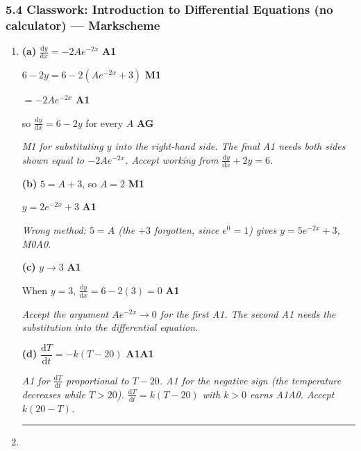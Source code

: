 \documentclass[12pt, twoside]{article}
\begin{document}
\subsubsection*{5.4 Classwork: Introduction to Differential Equations (no calculator) --- Markscheme}

\begin{enumerate}[itemsep=0.3cm]

\item[1.] [Maximum mark: 9]

\textbf{(a)} $\frac{\mathrm{d}y}{\mathrm{d}x} = -2Ae^{-2x}$ \hfill \textbf{A1}

$6 - 2y = 6 - 2\left(Ae^{-2x} + 3\right)$ \hfill \textbf{M1}

$= -2Ae^{-2x}$ \hfill \textbf{A1}

so $\frac{\mathrm{d}y}{\mathrm{d}x} = 6 - 2y$ for every $A$ \hfill \textbf{AG}

\emph{M1 for substituting $y$ into the right-hand side. The final A1 needs
both sides shown equal to $-2Ae^{-2x}$. Accept working from
$\frac{\mathrm{d}y}{\mathrm{d}x} + 2y = 6$.}

\textbf{(b)} $5 = A + 3$, so $A = 2$ \hfill \textbf{M1}

$y = 2e^{-2x} + 3$ \hfill \textbf{A1}

\emph{Wrong method: $5 = A$ (the $+3$ forgotten, since $e^{0} = 1$) gives
$y = 5e^{-2x} + 3$, M0A0.}

\textbf{(c)} $y \to 3$ \hfill \textbf{A1}

When $y = 3$, $\frac{\mathrm{d}y}{\mathrm{d}x} = 6 - 2(3) = 0$ \hfill \textbf{A1}

\emph{Accept the argument $Ae^{-2x} \to 0$ for the first A1. The second
A1 needs the substitution into the differential equation.}

\textbf{(d)} $\dfrac{\mathrm{d}T}{\mathrm{d}t} = -k\left(T - 20\right)$
\hfill \textbf{A1A1}

\emph{A1 for $\frac{\mathrm{d}T}{\mathrm{d}t}$ proportional to $T - 20$.
A1 for the negative sign (the temperature decreases while $T > 20$).
$\frac{\mathrm{d}T}{\mathrm{d}t} = k(T - 20)$ with $k > 0$ earns A1A0.
Accept $k\left(20 - T\right)$.}

\bigskip \hrule \bigskip

\item[2.] [Maximum mark: 9]


\end{enumerate}
\end{document}
